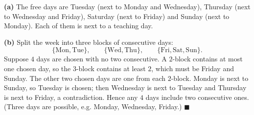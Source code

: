 \textbf{(a)} The free days are Tuesday (next to Monday and Wednesday), Thursday (next to Wednesday and Friday), Saturday (next to Friday) and Sunday (next to Monday). Each of them is next to a teaching day.

\textbf{(b)} Split the week into three blocks of consecutive days:
\[\{\text{Mon},\text{Tue}\},\qquad\{\text{Wed},\text{Thu}\},\qquad\{\text{Fri},\text{Sat},\text{Sun}\}.\]
Suppose $4$ days are chosen with no two consecutive. A $2$-block contains at most one chosen day, so the $3$-block contains at least $2$, which must be Friday and Sunday. The other two chosen days are one from each $2$-block. Monday is next to Sunday, so Tuesday is chosen; then Wednesday is next to Tuesday and Thursday is next to Friday, a contradiction. Hence any $4$ days include two consecutive ones. (Three days are possible, e.g. Monday, Wednesday, Friday.) $\blacksquare$
